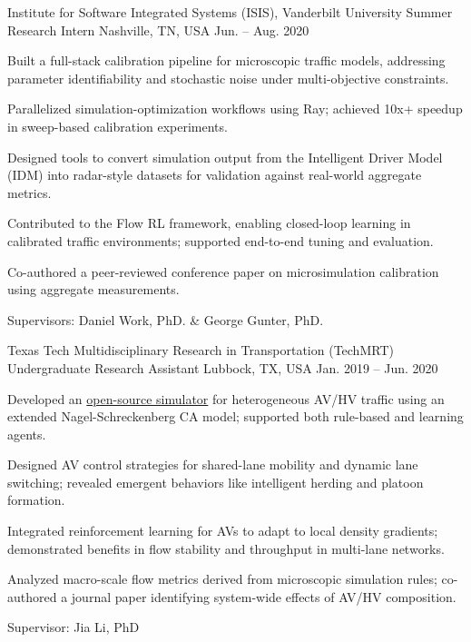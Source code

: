 \begin{cventries}
\cventry
  {Institute for Software Integrated Systems (ISIS), Vanderbilt University}
  {Summer Research Intern}
  {Nashville, TN, USA}
  {Jun. – Aug. 2020}
  {
    \begin{cvitems}
      \item{Built a full-stack calibration pipeline for microscopic traffic models, addressing parameter identifiability and stochastic noise under multi-objective constraints.}
      \item{Parallelized simulation-optimization workflows using Ray; achieved 10x+ speedup in sweep-based calibration experiments.}
      \item{Designed tools to convert simulation output from the Intelligent Driver Model (IDM) into radar-style datasets for validation against real-world aggregate metrics.}
      \item{Contributed to the Flow RL framework, enabling closed-loop learning in calibrated traffic environments; supported end-to-end tuning and evaluation.}
      \item{Co-authored a peer-reviewed conference paper on microsimulation calibration using aggregate measurements.}
    \item{Supervisors: Daniel Work, PhD. \& George Gunter, PhD.} 
    \end{cvitems}
  }


\cventry
  {Texas Tech Multidisciplinary Research in Transportation (TechMRT)}
  {Undergraduate Research Assistant}
  {Lubbock, TX, USA}
  {Jan. 2019 – Jun. 2020}
  {
    \begin{cvitems}
      \item{Developed an \href{https://github.com/shanto268/comprehensive_simulation_traffic_analysis_software}{open-source simulator} for heterogeneous AV/HV traffic using an extended Nagel-Schreckenberg CA model; supported both rule-based and learning agents.}
      \item{Designed AV control strategies for shared-lane mobility and dynamic lane switching; revealed emergent behaviors like intelligent herding and platoon formation.}
      \item{Integrated reinforcement learning for AVs to adapt to local density gradients; demonstrated benefits in flow stability and throughput in multi-lane networks.}
      \item{Analyzed macro-scale flow metrics derived from microscopic simulation rules; co-authored a journal paper identifying system-wide effects of AV/HV composition.}
      \item{Supervisor: Jia Li, PhD}
    \end{cvitems}
  }



\end{cventries}
